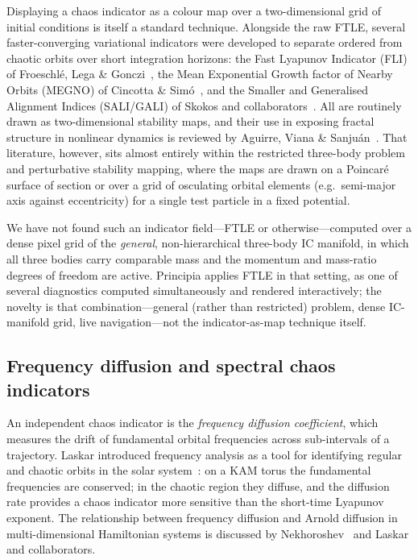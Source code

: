 \documentclass[11pt,a4paper]{article}
\begin{document}
Displaying a chaos indicator as a colour map over a two-dimensional grid of initial conditions
is itself a standard technique.  Alongside the raw FTLE, several faster-converging variational
indicators were developed to separate ordered from chaotic orbits over short integration
horizons: the Fast Lyapunov Indicator (FLI) of Froeschl\'{e}, Lega \& Gonczi~\cite{froeschle1997},
the Mean Exponential Growth factor of Nearby Orbits (MEGNO) of Cincotta \& Sim\'{o}~\cite{cincotta2000},
and the Smaller and Generalised Alignment Indices (SALI/GALI) of Skokos and
collaborators~\cite{skokos2001,skokos2007}.  All are routinely drawn as two-dimensional
stability maps, and their use in exposing fractal structure in nonlinear dynamics is reviewed by
Aguirre, Viana \& Sanju\'{a}n~\cite{aguirre2009}.  That literature, however, sits almost entirely
within the restricted three-body problem and perturbative stability mapping, where the maps are
drawn on a Poincar\'{e} surface of section or over a grid of osculating orbital elements
(e.g.\ semi-major axis against eccentricity) for a single test particle in a fixed potential.

We have not found such an indicator field---FTLE or otherwise---computed over a dense pixel grid
of the \emph{general}, non-hierarchical three-body IC manifold, in which all three bodies carry
comparable mass and the momentum and mass-ratio degrees of freedom are active.  Principia applies
FTLE in that setting, as one of several diagnostics computed simultaneously and rendered
interactively; the novelty is that combination---general (rather than restricted) problem, dense
IC-manifold grid, live navigation---not the indicator-as-map technique itself.

\subsection{Frequency diffusion and spectral chaos indicators}
\label{sec:freqdiff}

An independent chaos indicator is the \emph{frequency diffusion coefficient}, which measures
the drift of fundamental orbital frequencies across sub-intervals of a trajectory.  Laskar
introduced frequency analysis as a tool for identifying regular and chaotic orbits in the solar
system~\cite{laskar1990,laskar1993}: on a KAM torus the fundamental frequencies are conserved;
in the chaotic region they diffuse, and the diffusion rate provides a chaos indicator more
sensitive than the short-time Lyapunov exponent.  The relationship between frequency diffusion
and Arnold diffusion in multi-dimensional Hamiltonian systems is discussed by
Nekhoroshev~\cite{nekhoroshev1977} and Laskar and collaborators.
\end{document}
